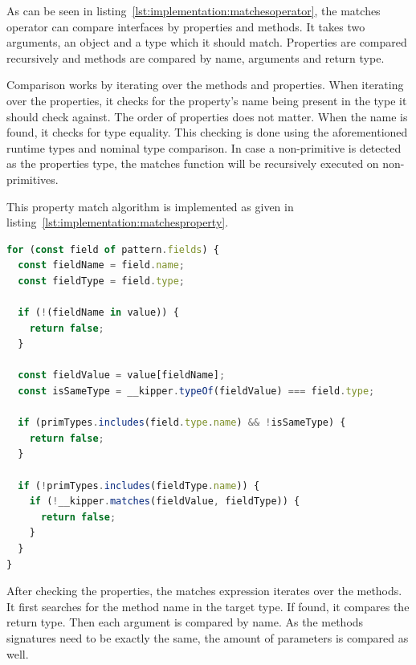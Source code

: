 As can be seen in listing~\ref{lst:implementation:matchesoperator}, the matches operator can compare interfaces by properties and methods. It takes two arguments, an object and a type which it should match. Properties are compared recursively and methods are compared by name, arguments and return type.

Comparison works by iterating over the methods and properties. When iterating over the properties, it checks for the property's name being present in the type it should check against. The order of properties does not matter. When the name is found, it checks for type equality. This checking is done using the aforementioned runtime types and nominal type comparison. In case a non-primitive is detected as the properties type, the matches function will be recursively executed on non-primitives.

This property match algorithm is implemented as given in listing~\ref{lst:implementation:matchesproperty}.

\begin{lstlisting}[language=Typescript,caption=Matches operator property comparison,label=lst:implementation:matchesproperty]
for (const field of pattern.fields) {
  const fieldName = field.name;
  const fieldType = field.type;

  if (!(fieldName in value)) {
    return false;
  }

  const fieldValue = value[fieldName];
  const isSameType = __kipper.typeOf(fieldValue) === field.type;

  if (primTypes.includes(field.type.name) && !isSameType) {
    return false;
  }

  if (!primTypes.includes(fieldType.name)) {
    if (!__kipper.matches(fieldValue, fieldType)) {
      return false;
    }
  }
}
\end{lstlisting}

After checking the properties, the matches expression iterates over the methods. It first searches for the method name in the target type. If found, it compares the return type. Then each argument is compared by name. As the methods signatures need to be exactly the same, the amount of parameters is compared as well.

